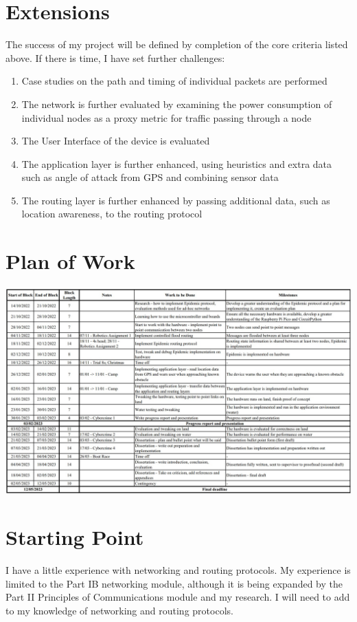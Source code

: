 \documentclass[10pt, a4paper]{article}
\begin{document}
\section{Extensions}
The success of my project will be defined by completion of the core criteria listed above. If there is time, I have set further challenges:
\begin{enumerate}
\item Case studies on the path and timing of individual packets are performed
\item The network is further evaluated by examining the power consumption of individual nodes as a proxy metric for traffic passing through a node
\item The User Interface of the device is evaluated
\item The application layer is further enhanced, using heuristics and extra data such as angle of attack from GPS and combining sensor data
\item The routing layer is further enhanced by passing additional data, such as location awareness, to the routing protocol
\end{enumerate}

\section{Plan of Work}
\includegraphics[width=\textwidth]{Plan.jpg}


\section{Starting Point} 
I have a little experience with networking and routing protocols. My experience is limited to the Part IB networking module, although it is being expanded by the Part II Principles of Communications module and my research. I will need to add to my knowledge of networking and routing protocols. \par
\end{document}
